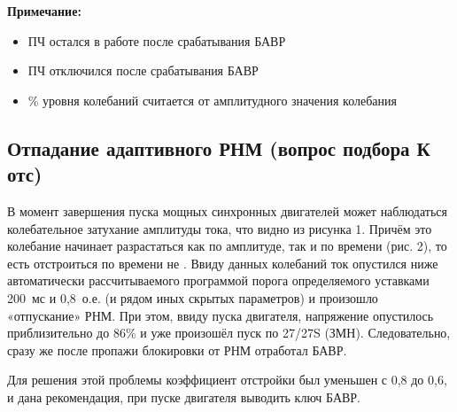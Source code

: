 
\textbf{Примечание:}
\begin{itemize}[leftmargin=*,itemsep=0pt]
    \item[+] ПЧ остался в работе после срабатывания БАВР
    \item[-] ПЧ отключился после срабатывания БАВР
    \item[\%] \% уровня колебаний считается от амплитудного значения колебания
\end{itemize}

\subsection{Отпадание адаптивного РНМ (вопрос подбора К отс)}
\label{sec:ch1_adaptive_dropout}

В момент завершения пуска мощных синхронных двигателей может наблюдаться колебательное затухание амплитуды тока, что видно из рисунка 1. Причём это колебание начинает разрастаться как по амплитуде, так и по времени (рис. 2), то есть отстроиться по времени не . Ввиду данных колебаний ток опустился ниже автоматически рассчитываемого программой порога определяемого уставками 200~мс и 0,8~о.е. (и рядом иных скрытых параметров) и произошло «отпускание» РНМ. При этом, ввиду пуска двигателя, напряжение опустилось приблизительно до 86\% и уже произошёл пуск по 27/27S (ЗМН). Следовательно, сразу же после пропажи блокировки от РНМ отработал БАВР.

Для решения этой проблемы коэффициент отстройки был уменьшен с 0,8 до 0,6, и дана
рекомендация, при пуске двигателя выводить ключ БАВР.

